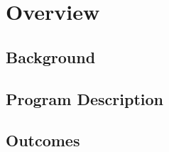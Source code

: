 \section{Overview}

\subsection{Background}

\subsection{Program Description}

\subsection{Outcomes}
